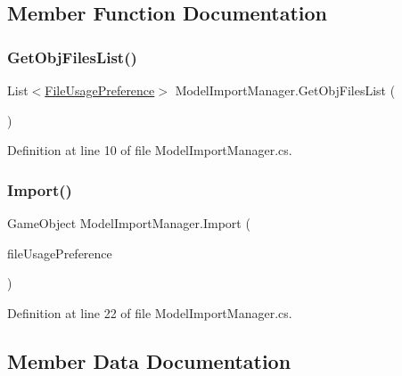 \subsection{Member Function Documentation}
\mbox{\label{class_model_import_manager_a6e6fafc0e15cc807f0a9687a5ac49823}} 
\subsubsection{\texorpdfstring{GetObjFilesList()}{GetObjFilesList()}}
{\footnotesize\ttfamily List$<$\mbox{\hyperlink{class_file_usage_preference}{File\+Usage\+Preference}}$>$ Model\+Import\+Manager.\+Get\+Obj\+Files\+List (\begin{DoxyParamCaption}{ }\end{DoxyParamCaption})}



Definition at line 10 of file Model\+Import\+Manager.\+cs.

\mbox{\label{class_model_import_manager_a7f3893bf9257d111ee24f45533deeb51}} 
\subsubsection{\texorpdfstring{Import()}{Import()}}
{\footnotesize\ttfamily Game\+Object Model\+Import\+Manager.\+Import (\begin{DoxyParamCaption}\item[{\mbox{\hyperlink{class_file_usage_preference}{File\+Usage\+Preference}}}]{file\+Usage\+Preference }\end{DoxyParamCaption})}



Definition at line 22 of file Model\+Import\+Manager.\+cs.



\subsection{Member Data Documentation}
\mbox{\label{class_model_import_manager_a033e080b994736360d2230a94b49a8f3}} 
